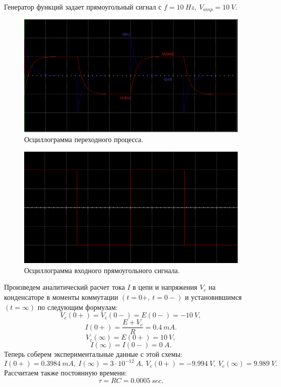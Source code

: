 \documentclass[12pt]{article}
\begin{document}
Генератор функций задает прямоугольный сигнал с $f = 10 \ Hz, \ V_{amp} = 10 \ V$. \\
\begin{figure}[H]
    \centering
    \includegraphics[width=\textwidth]{tran_1.png}
    \caption{Осциллограмма переходного процесса.}
    \label{fig:tran_1}
\end{figure}
\begin{figure}[H]
    \centering
    \includegraphics[width=\textwidth]{signal.png}
    \caption{Осциллограмма входного прямоугольного сигнала.}
    \label{fig:signal}
\end{figure}

Произведем аналитический расчет тока $I$ в цепи и напряжения $V_c$ на конденсаторе в моменты коммутации $(t=0+, \ t=0-)$ и установившимся $(t=\infty)$ по следующим формулам:
\[
    V_c(0+) =V_c(0-) = E(0-) = -10 \ V,
\]
\[
    I(0+) = \frac{E+V_c}{R} = 0.4 \ mA.
\]
\[
    V_c(\infty) = E(0+) = 10 \ V,
\]
\[
    I(\infty) = I(0-) = 0 \ A.
\]
Теперь соберем экспериментальные данные с этой схемы:
\[
    I(0+) = 0.3984 \ mA, \ I(\infty) = 3\cdot10^{-12} \ A, \ V_c(0+) = -9.994 \ V, \ V_c(\infty) = 9.989 \ V.
\]
Рассчитаем также постоянную времени:
\[
    \tau = RC = 0.0005 \ sec.
\]
\end{document}

